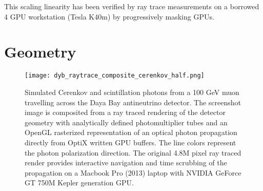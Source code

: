 \documentclass[a4paper]{jpconf}
\begin{document}
This scaling linearity has been verified by ray trace measurements on a 
borrowed 4 GPU workstation (Tesla K40m) by progressively masking GPUs.


\section{Geometry}

\begin{figure}[htbp]
\centering
\texttt{[image: dyb\_raytrace\_composite\_cerenkov\_half.png]}
\caption{
Simulated Cerenkov and scintillation photons from a 100 GeV muon travelling
across the Daya Bay antineutrino detector. The screenshot image is composited from 
a ray traced rendering of the detector geometry with analytically defined photomultiplier tubes 
and an OpenGL rasterized representation of an optical photon propagation directly from OptiX written GPU buffers. 
The line colors represent the photon polarization direction. The original 4.8M pixel ray traced
render provides interactive navigation and time scrubbing of the propagation on a 
Macbook Pro (2013) laptop with NVIDIA GeForce GT 750M Kepler generation GPU.}
\end{figure}
\end{document}
